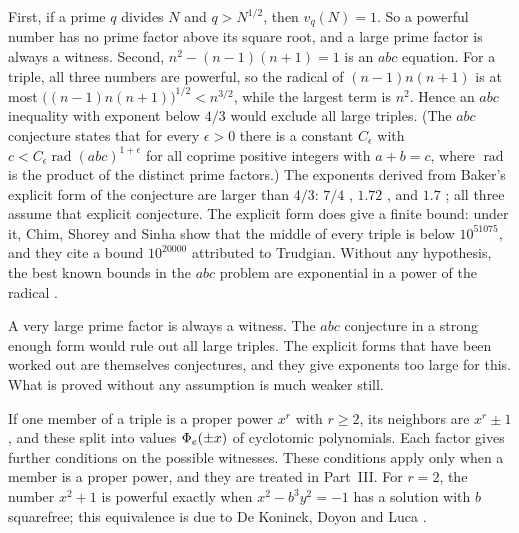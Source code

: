 \begin{remark}
First, if a prime $q$ divides $N$ and $q > N^{1/2}$, then $v_q(N) = 1$. So a powerful number has no prime factor above its square root, and
a large prime factor is always a witness. Second, $n^2 - (n - 1)(n + 1) = 1$ is an $abc$ equation. For a triple, all three numbers are
powerful, so the radical of $(n - 1)n(n + 1)$ is at most $\bigl((n - 1)n(n + 1)\bigr)^{1/2} < n^{3/2}$, while the largest term is $n^2$.
Hence an $abc$ inequality with exponent below $4/3$ would exclude all large triples. (The $abc$ conjecture states that for every
$\epsilon > 0$ there is a constant $C_\epsilon$ with $c < C_\epsilon \operatorname{rad}(abc)^{1 + \epsilon}$ for all coprime positive
integers with $a + b = c$, where $\operatorname{rad}$ is the product of the distinct prime factors.) The exponents derived from Baker's
explicit form of the conjecture are larger than $4/3$: $7/4$ \cite[Theorem~1]{LaishramShorey2012}, $1.72$ \cite[Theorem~1.4]{ChimShoreySinha2019}, and $1.7$
\cite[Theorem~4.1]{ChimNairShorey2018}; all three assume that explicit conjecture. The explicit form does give a finite bound: under it,
Chim, Shorey and Sinha \cite[Theorem~1.8]{ChimShoreySinha2019} show that the middle of every triple is below $10^{51075}$, and they cite a bound
$10^{20000}$ attributed to Trudgian. Without any hypothesis, the best known bounds in the $abc$ problem are exponential in a power of the
radical \cite{StewartYu2001}.
\end{remark}

\inwords A very large prime factor is always a witness. The $abc$ conjecture in a strong enough form would rule out all large triples.
The explicit forms that have been worked out are themselves conjectures, and they give exponents too large for this. What is proved
without any assumption is much weaker still.

\begin{remark}
If one member of a triple is a proper power $x^r$ with $r \ge 2$, its neighbors are $x^r \pm 1$, and these split into values
$\Phi_{e}(\pm x)$ of cyclotomic polynomials. Each factor gives further conditions on the possible witnesses. These conditions apply only
when a member is a proper power, and they are treated in Part~III. For $r = 2$, the number $x^2 + 1$ is powerful exactly when
$x^2 - b^3 y^2 = -1$ has a solution with $b$ squarefree; this equivalence is due to De Koninck, Doyon and Luca
\cite[(1)--(2)]{DeKoninckDoyonLuca2011}.
\end{remark}

